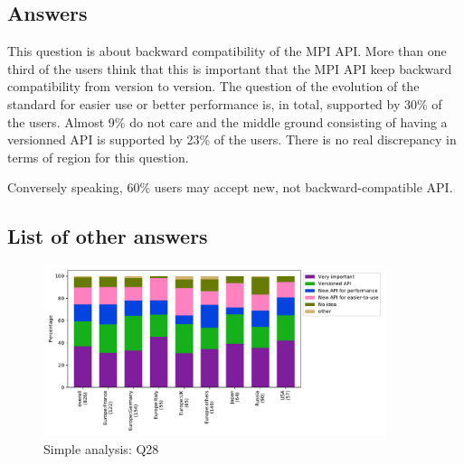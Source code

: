 
\subsection{Answers}


This question is about backward compatibility of the MPI API. More than one
third of the users think that this is important that the MPI API keep backward
compatibility from version to version. The question of the evolution of the
standard for easier use or better performance is, in total,  supported by 30\%
of the users. Almost 9\% do not care and the middle ground consisting of having
a versionned API is supported by 23\% of the users. There is no real discrepancy in
terms of region for this question. 

Conversely speaking, 60\% users may accept new, not backward-compatible API.

\subsection{List of other answers}
\begin{itemize}

\end{itemize}

\begin{figure}[htb]
\begin{center}
\includegraphics[width=10cm]{../pdfs/Q28.pdf}
\caption{Simple analysis: Q28}
\label{fig:Q28}
\end{center}
\end{figure}
